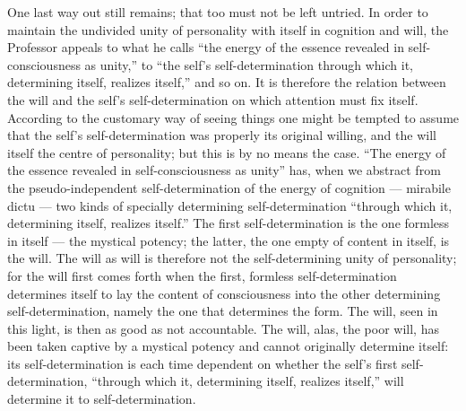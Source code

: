 \documentclass[12pt]{book}
\newcommand{\opage}[1]{\marginnote{\footnotesize\textit{[#1]}}}
\begin{document}
One last way out still remains; that too must not be left untried. In order
to maintain the undivided unity of personality with itself in cognition and
will, the Professor appeals to what he calls ``the energy of the essence
revealed in self-consciousness as unity,'' to ``the self's
self-determination through which it, determining itself, realizes itself,''
and so on. It is therefore the relation between the will and the self's
self-determination on which attention must fix itself. According to the
customary way of seeing things one might be tempted to assume that the
self's self-determination was properly its original willing, and the will
itself the centre of personality; but this is by no means the case. ``The
energy of the essence revealed in self-consciousness as unity''
\opage{43}\setcounter{footnote}{0}%
has, when we abstract from the pseudo-independent self-determination of the
energy of cognition --- mirabile dictu --- two kinds of specially
determining self-determination ``through which it, determining itself,
realizes itself.'' The first self-determination is the one formless in
itself --- the mystical potency; the latter, the one empty of content in
itself, is the will. The will as will is therefore not the self-determining
unity of personality; for the will first comes forth when the first,
formless self-determination determines itself to lay the content of
consciousness into the other determining self-determination, namely the one
that determines the form. The will, seen in this light, is then as good as
not accountable. The will, alas, the poor will, has been taken captive by a
mystical potency and cannot originally determine itself: its
self-determination is each time dependent on whether the self's first
self-determination, ``through which it, determining itself, realizes
itself,'' will determine it to self-determination.
\end{document}
